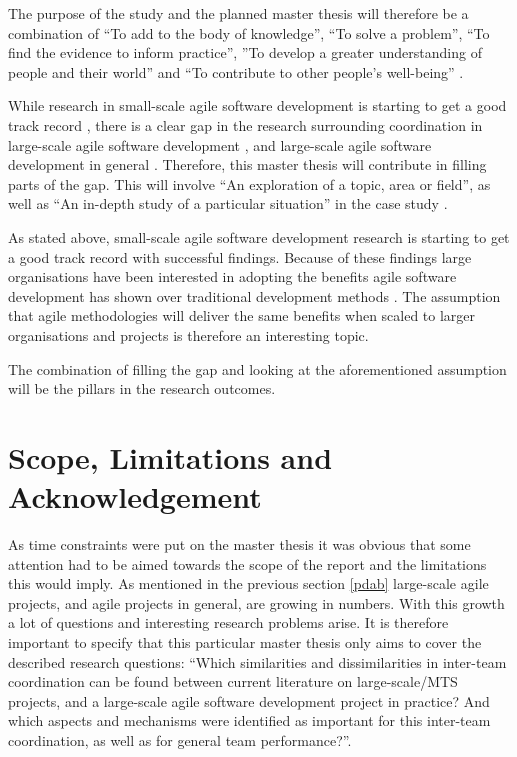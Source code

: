 The purpose of the study and the planned master thesis will therefore be a combination of ``To add to the body of knowledge'', ``To solve a problem'', ``To find the evidence to inform practice'', ''To develop a greater understanding of people and their world'' and ``To contribute to other people's well-being'' \cite{Oates2006}.

While research in small-scale agile software development is starting to get a good track record \cite{Paasivaara2012, Haaster2014}, there is a clear gap in the research surrounding coordination in large-scale agile software development \cite{Pikkarainen2008, Paasivaara2012, Dingsoyr2013b}, and large-scale agile software development in general \cite{Freudenberg2010, Haaster2014}. Therefore, this master thesis will contribute in filling parts of the gap. This will involve ``An exploration of a topic, area or field'', as well as ``An in-depth study of a particular situation'' in the case study \cite{Oates2006}.

As stated above, small-scale agile software development research is starting to get a good track record with successful findings. Because of these findings large organisations have been interested in adopting the benefits agile software development has shown over traditional development methods \cite{Com2013, Vlietland2015, Agerfalk2006, Paasivaara2012}. The assumption that agile methodologies will deliver the same benefits when scaled to larger organisations and projects is therefore an interesting topic.

The combination of filling the gap and looking at the aforementioned assumption will be the pillars in the research outcomes.

\section{Scope, Limitations and Acknowledgement}

As time constraints were put on the master thesis it was obvious that some attention had to be aimed towards the scope of the report and the limitations this would imply. As mentioned in the previous section \ref{pdab} large-scale agile projects, and agile projects in general, are growing in numbers. With this growth a lot of questions and interesting research problems arise. It is therefore important to specify that this particular master thesis only aims to cover the described research questions: ``Which similarities and dissimilarities in inter-team coordination can be found between current literature on large-scale/MTS projects, and a large-scale agile software development project in practice? And which aspects and mechanisms were identified as important for this inter-team coordination, as well as for general team performance?''.

